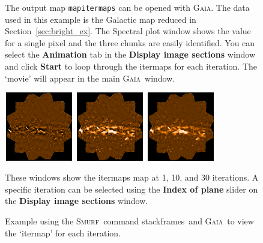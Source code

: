 \documentclass[twoside,11pt]{article}
\newcommand{\htmlref}[2]{#1}
\newenvironment{latexonly}{}{}
\newcommand{\latexhtml}[2]{#1}
\newcommand{\xref}[3]{#1}
\renewcommand{\_}{\texttt{\symbol{95}}}
\newenvironment{fmpage}[1]{\begin{lrbox}{\fmbox}\begin{minipage}{#1}}{\end{minipage}\end{lrbox}\fbox{\usebox{\fmbox}}}
\newcommand{\gaia}{\xref{\textsc{Gaia}}{sun214}{}}
\newcommand{\smurf}{\xref{\textsc{Smurf}}{sun258}{}}
\newcommand{\task}[1]{\textsf{#1}}
\newcommand{\file}[1]{\texttt{#1}}
\newcommand{\gaiathing}[1]{\textbf{\textsf{#1}}}
\newcommand{\stackframes}{\xref{\task{stackframes}}{sun258}{STACKFRAMES}}
\newcommand{\cref}[3]{\latexhtml{#1~\ref{#2}}{\htmlref{#3}{#2}}}
\begin{document}
\begin{latexonly}
\begin{figure}[ht!]
\begin{center}
\begin{fmpage}{0.95\linewidth}
\begin{minipage}[c]{0.65\linewidth}
\end{minipage}
\hspace{0.3cm}
\begin{minipage}[c]{0.29\linewidth}
The output map \file{map\_itermaps} can be opened with \gaia. The data used
in this example is the Galactic map reduced in
\cref{Section}{sec:bright_ex}{\file{dimmconfig\_bright\_extended.lis}}. The
Spectral plot window shows the value for a single pixel and the three
chunks are easily identified. You can select the \gaiathing{Animation} tab
in the \gaiathing{Display image sections} window and click
\gaiathing{Start} to loop through the itermaps for each iteration.  The
`movie' will appear in the main \gaia\ window.
\end{minipage}

\vspace{0.7cm}

\begin{minipage}[c]{0.65\linewidth}
\centering
\hspace{0.5mm}
\includegraphics[width=3cm, height=3cm]{sc21_iter1}
\includegraphics[width=3cm, height=3cm]{sc21_iter2}
\includegraphics[width=3cm, height=3cm]{sc21_iter31}
\vspace{0.2cm}
\end{minipage}
\hspace{0.3cm}
\begin{minipage}[c]{0.29\linewidth}
These windows show the itermaps map at 1, 10, and 30 iterations. A
specific iteration can be selected using the \gaiathing{Index of plane}
slider on the \gaiathing{Display image sections} window.
\vspace{0.2cm}
\end{minipage}
\end{fmpage}
\end{center}
\caption[View maps for each iteration]{
  \small Example using the \smurf\ command \stackframes\ and
  \gaia\ to view the `itermap' for each iteration.
}
\label{fig:stack}
\end{figure}
\end{latexonly}
\end{document}
